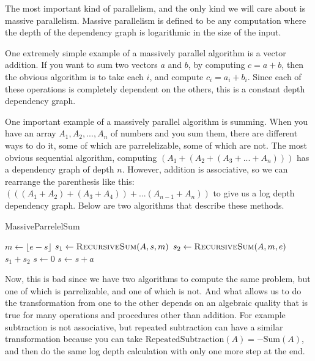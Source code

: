 \documentclass[12pt,twoside]{reedthesis}
\newcommand{\floor}[1]{\lfloor #1 \rfloor}
\begin{document}
		The most important kind of parallelism, and the only kind we will care about is massive parallelism. Massive parallelism is defined to be any computation where the depth of the dependency graph is logarithmic in the size of the input. 
		
		One extremely simple example of a massively parallel algorithm is a vector addition. If you want to sum two vectors $a$ and $b$, by computing $c = a+b$, then the obvious algorithm is to take each $i$, and compute $c_i = a_i + b_i$. Since each of these operations is completely dependent on the others, this is a constant depth dependency graph. 
		
		One important example of a massively parallel algorithm is summing. When you have an array $A_1,A_2,...,A_n$ of numbers and you sum them, there are different ways to do it, some of which are parrelelizable, some of which are not. The most obvious sequential algorithm, computing $(A_1+(A_2+(A_3+...+A_n)))$ has a dependency graph of depth $n$. However, addition is associative, so we can rearrange the parenthesis like this: $(((A_1+A_2)+(A_3+A_4))+...(A_{n-1}+A_n))$ to give us a log depth dependency graph. Below are two algorithms that describe these methods.
		
		\begin{algorithm}
			\caption{MassiveParrelelSum}\label{parellelsum}
			\begin{algorithmic}[1]
					\EndIf
					\State $m \gets \floor{e-s}$
					\State $s_1 \gets \textsc{RecursiveSum}(A,s,m)$
					\State $s_2 \gets \textsc{RecursiveSum}(A,m,e)$
					\State \Return $s_1+s_2$
				\EndFunction
					\State $s \gets 0$
						\State $s \gets s + a$
					\EndFor
				\EndFunction
			\end{algorithmic}
		\end{algorithm}
		
		Now, this is bad since we have two algorithms to compute the same problem, but one of which is parrelizable, and one of which is not. And what allows us to do the transformation from one to the other depends on an algebraic quality that is true for many operations and procedures other than addition. For example subtraction is not associative, but repeated subtraction can have a similar transformation because you can take $\text{RepeatedSubtraction}(A) = -\text{Sum}(A)$, and then do the same log depth calculation with only one more step at the end. 
		
\end{document}
